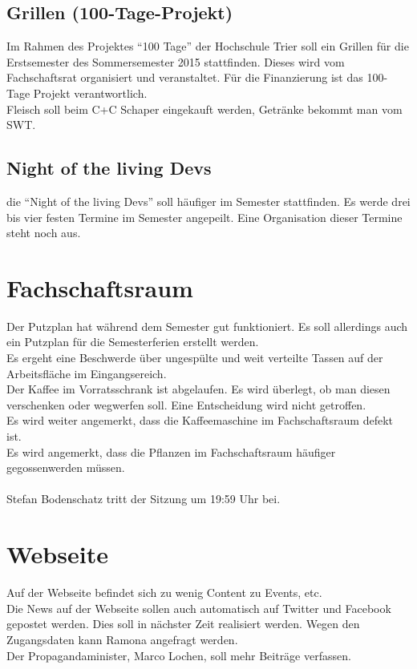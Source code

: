 \documentclass[a4paper, 11pt]{article} %
\begin{document}
\subsection{Grillen (100-Tage-Projekt)}
Im Rahmen des Projektes "`100 Tage"' der Hochschule Trier soll ein Grillen für die Erstsemester des Sommersemester 2015 stattfinden. Dieses wird vom Fachschaftsrat organisiert und veranstaltet. Für die Finanzierung ist das 100-Tage Projekt verantwortlich. \\
Fleisch soll beim C+C Schaper eingekauft werden, Getränke bekommt man vom SWT.

\subsection{Night of the living Devs}
die "`Night of the living Devs"' soll häufiger im Semester stattfinden. Es werde drei bis vier festen Termine im Semester angepeilt. Eine Organisation dieser Termine steht noch aus.

\section{Fachschaftsraum}
Der Putzplan hat während dem Semester gut funktioniert. Es soll allerdings auch ein Putzplan für die Semesterferien erstellt werden. \\
Es ergeht eine Beschwerde über ungespülte und weit verteilte Tassen auf der Arbeitsfläche im Eingangsereich.\\
Der Kaffee im Vorratsschrank ist abgelaufen. Es wird überlegt, ob man diesen verschenken oder wegwerfen soll. Eine Entscheidung wird nicht getroffen.\\
Es wird weiter angemerkt, dass die Kaffeemaschine im Fachschaftsraum defekt ist.\\
Es wird angemerkt, dass die Pflanzen im Fachschaftsraum häufiger gegossenwerden müssen.\\\\
Stefan Bodenschatz tritt der Sitzung um 19:59 Uhr bei.

\section{Webseite}
Auf der Webseite befindet sich zu wenig Content zu Events, etc.\\
Die News auf der Webseite sollen auch automatisch auf Twitter und Facebook gepostet werden. Dies soll in nächster Zeit realisiert werden. Wegen den Zugangsdaten kann Ramona angefragt werden.\\
Der Propagandaminister, Marco Lochen, soll mehr Beiträge verfassen.
\end{document}
